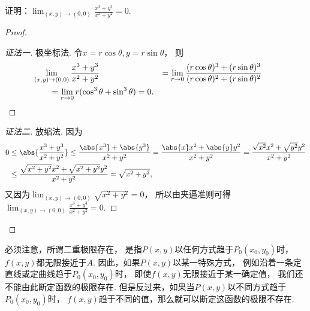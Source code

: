 \begin{example}
证明：\(\lim_{(x,y)\to(0,0)} \frac{x^3+y^3}{x^2+y^2} = 0\).
\begin{proof}
\begin{proof}[证法一]
极坐标法.
令\(
	x = r \cos\theta,
	y = r \sin\theta
\)，
则\begin{align*}
	&\hspace{-20pt}
	\lim_{(x,y)\to(0,0)} \frac{x^3+y^3}{x^2+y^2}
	&= \lim_{r\to0} \frac{(r \cos\theta)^3+(r \sin\theta)^3}{(r \cos\theta)^2+(r \sin\theta)^2} \\
	&= \lim_{r\to0} r (\cos^3\theta + \sin^3\theta)
	= 0.
\end{align*}
\end{proof}
\begin{proof}[证法二]
放缩法.
因为\begin{align*}
	0 &\leq \abs{\frac{x^3+y^3}{x^2+y^2}}
	\leq \frac{\abs{x^3}+\abs{y^3}}{x^2+y^2}
	= \frac{\abs{x}x^2+\abs{y}y^2}{x^2+y^2}
	= \frac{\sqrt{x^2}x^2+\sqrt{y^2}y^2}{x^2+y^2} \\
	&\leq \frac{\sqrt{x^2+y^2}x^2+\sqrt{x^2+y^2}y^2}{x^2+y^2}
	= \sqrt{x^2+y^2},
\end{align*}
又因为\(\lim_{(x,y)\to(0,0)} \sqrt{x^2+y^2} = 0\)，
所以由夹逼准则可得\(\lim_{(x,y)\to(0,0)} \frac{x^3+y^3}{x^2+y^2} = 0\).
\end{proof}
\end{proof}
\end{example}

必须注意，所谓二重极限存在，
是指\(P(x,y)\)以任何方式趋于\(P_0(x_0,y_0)\)时，\(f(x,y)\)都无限接近于\(A\).
因此，如果\(P(x,y)\)以某一特殊方式，
例如沿着一条定直线或定曲线趋于\(P_0(x_0,y_0)\)时，
即使\(f(x,y)\)无限接近于某一确定值，
我们还不能由此断定函数的极限存在.
但是反过来，如果当\(P(x,y)\)以不同方式趋于\(P_0(x_0,y_0)\)时，
\(f(x,y)\)趋于不同的值，那么就可以断定这函数的极限不存在.

